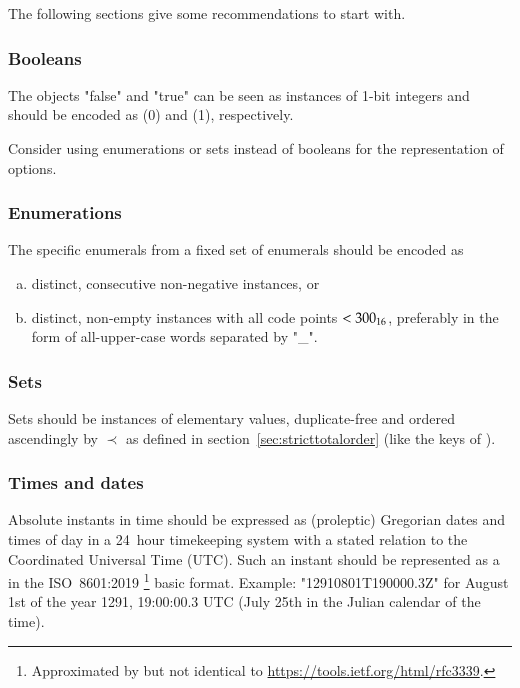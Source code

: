 The following sections give some recommendations to start with.


\subsubsection{Booleans}

The objects "false" and "true" can be seen as instances of 1-bit integers and should be encoded as
\DborIntegerValue(0) and \DborIntegerValue(1), respectively.

Consider using enumerations or sets instead of booleans for the representation of options.


\subsubsection{Enumerations}

The specific enumerals from a fixed set of enumerals should be encoded as
\begin{enumerate}[a)]
    \item
    distinct, consecutive non-negative \DborIntegerValue{} instances, or

    \item
    distinct, non-empty \DborUtfEightStringValue{} instances with all code points $< \mathrm{300}_{16}$,
    preferably in the form of all-upper-case words separated by "\_".
\end{enumerate}


\subsubsection{Sets}

Sets should be \DborSequenceValue{} instances of elementary values,
duplicate-free and ordered ascendingly by ${\prec}$ as defined in section~\ref{sec:stricttotalorder}
(like the keys of \DborDictionaryValue).


\subsubsection{Times and dates}

Absolute instants in time should be expressed as (proleptic) Gregorian dates and times of day in a
24~hour timekeeping system with a stated relation to the Coordinated Universal Time (UTC).
Such an instant should be represented as a \DborUtfEightStringValue{} in the ISO~8601:2019 %
\footnote{%
    Approximated by but not identical to \href{RFC~2229}{https://tools.ietf.org/html/rfc3339}.
} basic format.
Example: "12910801T190000.3Z" for August 1st of the year 1291, 19:00:00.3 UTC
(July 25th in the Julian calendar of the time).
